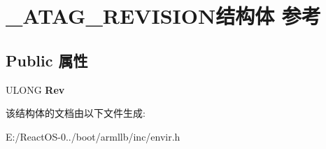 \hypertarget{struct___a_t_a_g___r_e_v_i_s_i_o_n}{}\section{\+\_\+\+A\+T\+A\+G\+\_\+\+R\+E\+V\+I\+S\+I\+O\+N结构体 参考}
\label{struct___a_t_a_g___r_e_v_i_s_i_o_n}
\subsection*{Public 属性}
\begin{DoxyCompactItemize}
\item 
\mbox{\label{struct___a_t_a_g___r_e_v_i_s_i_o_n_a003a9b8639b2ee91c5fadf3d747ea344}} 
U\+L\+O\+NG {\bfseries Rev}
\end{DoxyCompactItemize}


该结构体的文档由以下文件生成\+:\begin{DoxyCompactItemize}
\item 
E\+:/\+React\+O\+S-\/0../boot/armllb/inc/envir.\+h\end{DoxyCompactItemize}

